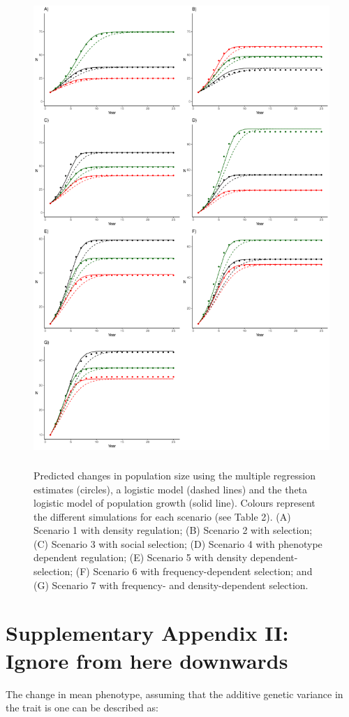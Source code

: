 \documentclass{article}
\begin{document}
 \begin{figure}[H] 
 	\centering
 	\includegraphics[width=12cm, height=18cm]{Figures/FigS4.pdf}
 	\caption{Predicted changes in population size using the multiple regression estimates (circles), a logistic model (dashed lines) and the theta logistic model of population growth (solid line). Colours represent the different simulations for each scenario (see Table 2). (A) Scenario 1 with density regulation; (B) Scenario 2 with selection; (C) Scenario 3 with social selection; (D) Scenario 4 with phenotype dependent regulation; (E) Scenario 5 with density dependent-selection; (F) Scenario 6 with frequency-dependent selection; and (G) Scenario 7 with frequency- and density-dependent selection.} 
 	\label{fig:growth}
 \end{figure}
 
 \section{Supplementary Appendix II: Ignore from here downwards}
The change in mean phenotype, assuming that the additive genetic variance in the trait is one can be described as:
 
\end{document}
